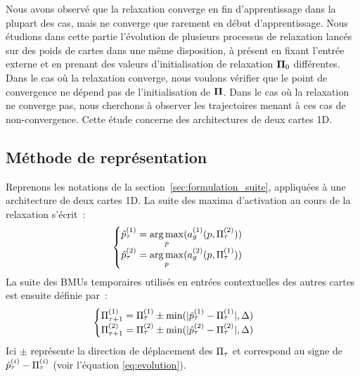 \documentclass[../main]{subfiles}
\begin{document}
Nous avons observé que la relaxation converge en fin d'apprentissage dans la plupart des cas, mais ne converge que rarement en début d'apprentissage.
Nous étudions dans cette partie l'évolution de plusieurs processus de relaxation lancés sur des poids de cartes dans une même disposition, à présent en fixant l'entrée externe et en prenant des valeurs d'initialisation de relaxation $\mathbf{\Pi}_0$ différentes.
Dans le cas où la relaxation converge, nous voulons vérifier que le point de convergence ne dépend pas de l'initialisation de $\mathbf{\Pi}$.
Dans le cas où la relaxation ne converge pas, nous cherchons à observer les trajectoires menant à ces cas de non-convergence. Cette étude concerne des architectures de deux cartes 1D.

\subsection{Méthode de représentation\label{sec:relax_expe}}

Reprenons les notations de la section~\ref{sec:formulation_suite}, appliquées à une architecture de deux cartes 1D. La suite des maxima d'activation au cours de la relaxation s'écrit~:
\begin{equation*}
	\begin{cases}
	\hat{p}^{({1})}_\tau = \operatorname*{arg\,max}\limits_p(a_g^{({1})}(p, \Pi^{({2})}_\tau))\\
	\hat{p}^{({2})}_\tau = \operatorname*{arg\,max}\limits_p(a_g^{({2})}(p, \Pi^{({1})}_\tau)) \\
	\end{cases}
	\end{equation*}
La suite des BMUs temporaires utilisés en entrées contextuelles des autres cartes est ensuite définie par~:
\begin{align*}
	&\begin{cases}
	\Pi^{({1})}_{\tau+1} = \Pi^{({1})}_\tau \pm \min(\lvert \hat{p}^{({1})}_\tau - \Pi^{({1})}_\tau \rvert, \Delta)  \\
	\Pi^{({2})}_{\tau+1} = \Pi^{({2})}_\tau \pm \min(\lvert \hat{p}^{({2})}_\tau - \Pi^{({2})}_\tau \rvert, \Delta) \\
	\end{cases}
	\end{align*}
Ici $\pm$ représente la direction de déplacement des $\Pi_\tau$ et correspond au signe de $\hat{p}^{({i})}_\tau - \Pi^{({i})}_\tau$ (voir l'équation \ref{eq:evolution}).
\end{document}
